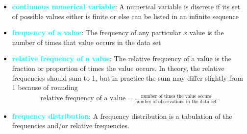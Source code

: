 \documentclass{report}
\begin{document}
\begin{itemize}
        \item \textbf{\textcolor{cyan}{continuous numerical variable}}: A numerical variable is discrete if its set of possible values either is finite or else can be listed in an infinite sequence
        \item \textbf{\textcolor{cyan}{frequency of a value}}: The frequency of any particular $x$ value is the number of times that value occurs in the data set
        \item \textbf{\textcolor{cyan}{relative frequency of a value}}: The relative frequency of a value is the fraction or proportion of times the value occurs. In theory, the relative frequencies should sum to 1, but in practice the sum may differ slightly from 1 because of rounding
            \begin{align*}
                \text{relative frequency of a value} = \frac{\text{number of times the value occurs}}{\text{number of observations in the data set}}
            .\end{align*}
        \item \textbf{\textcolor{cyan}{frequency distribution}}: A frequency distribution is a tabulation of the frequencies and/or relative frequencies.


\end{itemize}
\end{document}
